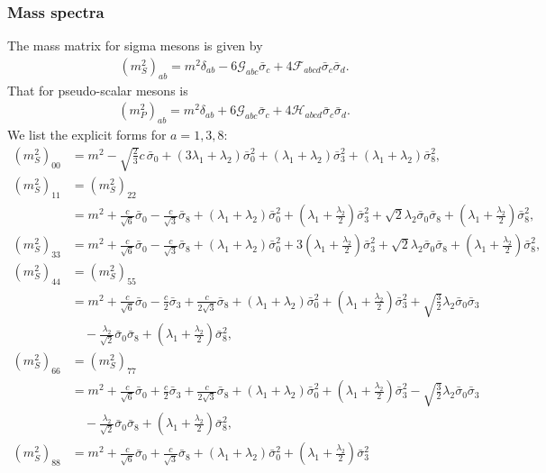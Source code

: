 \documentclass[a4paper,preprint,superscriptaddress,preprintnumbers,nofootinbib]{revtex4}
\newcommand{\al}[1]{\begin{align}#1\end{align}}
\newcommand{\nn}{\nonumber\\}
\begin{document}
\begin{appendix}
\subsubsection{Mass {spectra}}
The mass matrix for sigma mesons is given by
\al{
(m^2_S)_{ab}=m^2 \delta_{ab} -6{\mathcal G}_{abc}\bar \sigma_c+4{\mathcal F}_{abcd}\bar \sigma_c \bar \sigma_d.
\label{Smass}
}
That for pseudo-scalar mesons is
\al{
(m^2_P)_{ab}=
m^2 \delta_{ab} + 6{\mathcal G}_{abc}\bar \sigma_c+4{\mathcal H}_{abcd}\bar \sigma_c \bar \sigma_d.
\label{Pmass}
}
We list the explicit forms for $a=1,3,8$:\\
\al{
(m^2_S)_{00}&=m^2
-\sqrt{\frac{2}{3}}c\, \bar \sigma_0 
+ (3\lambda_1+\lambda_2)\bar \sigma_0^2+(\lambda_1+\lambda_2)\bar \sigma_3^2+(\lambda_1+\lambda_2)\bar \sigma_8^2,\\
(m^2_S)_{11}&=(m^2_S)_{22}\nn
&=m^2
+\frac{c}{\sqrt{6}}\bar \sigma_0
-\frac{c}{\sqrt{3}}\bar \sigma_8
+(\lambda_1+\lambda_2)\bar \sigma_0^2 
+ \left(\lambda_1+\frac{\lambda_2}{2}\right) \bar \sigma_3^2
+\sqrt{2}\lambda_2 \bar \sigma_0\bar \sigma_8 
+\left(\lambda_1+\frac{\lambda_2}{2}\right) \bar \sigma_8^2,\\
(m^2_S)_{33}&=m^2
+\frac{c}{\sqrt{6}}\bar \sigma_0
-\frac{c}{\sqrt{3}}\bar \sigma_8
+(\lambda_1+\lambda_2)\bar \sigma_0^2 
+ 3\left(\lambda_1+\frac{\lambda_2}{2}\right) \bar \sigma_3^2
+\sqrt{2}\lambda_2 \bar \sigma_0\bar \sigma_8 
+\left(\lambda_1+\frac{\lambda_2}{2}\right) \bar \sigma_8^2,\\
(m^2_S)_{44}&=(m^2_S)_{55}\nn
&=m^2
+\frac{c}{\sqrt{6}}\bar \sigma_0
-\frac{c}{2}\bar \sigma_3
+\frac{c}{2\sqrt{3}}\bar \sigma_8
+(\lambda_1+\lambda_2)\bar \sigma_0^2 
+ \left(\lambda_1+\frac{\lambda_2}{2}\right) \bar \sigma_3^2
+\sqrt{\frac{3}{2}}\lambda_2\bar \sigma_0\bar \sigma_3\nn
&\quad -\frac{\lambda_2}{\sqrt{2}} \bar \sigma_0\bar \sigma_8 
+\left(\lambda_1+\frac{\lambda_2}{2}\right) \bar \sigma_8^2,\\
(m^2_S)_{66}&=(m^2_S)_{77}\nn
&=m^2
+\frac{c}{\sqrt{6}}\bar \sigma_0
+\frac{c}{2}\bar \sigma_3
+\frac{c}{2\sqrt{3}}\bar \sigma_8
+(\lambda_1+\lambda_2)\bar \sigma_0^2 
+ \left(\lambda_1+\frac{\lambda_2}{2}\right) \bar \sigma_3^2
-\sqrt{\frac{3}{2}}\lambda_2\bar \sigma_0\bar \sigma_3\nn
&\quad -\frac{\lambda_2}{\sqrt{2}} \bar \sigma_0\bar \sigma_8 
+\left(\lambda_1+\frac{\lambda_2}{2}\right) \bar \sigma_8^2,\\
(m^2_S)_{88}&=m^2
+\frac{c}{\sqrt{6}}\bar \sigma_0
+\frac{c}{\sqrt{3}}\bar \sigma_8
+(\lambda_1+\lambda_2)\bar \sigma_0^2 
+ \left(\lambda_1+\frac{\lambda_2}{2}\right) \bar \sigma_3^2
}
\end{appendix}
\end{document}
